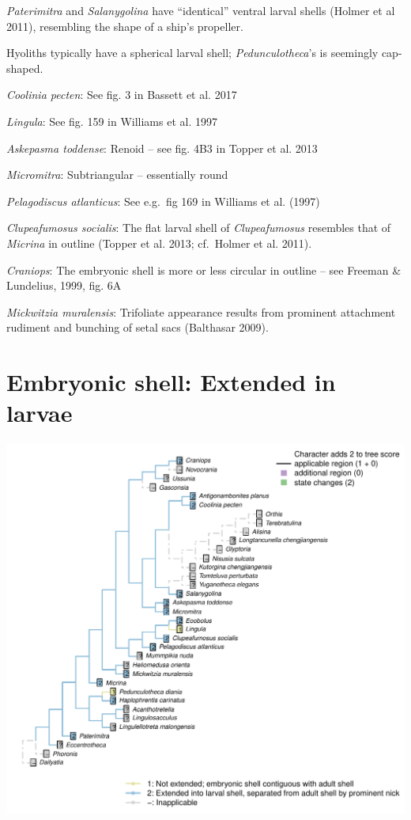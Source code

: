 \documentclass[]{book}
\theoremstyle{definition}
\theoremstyle{definition}
\theoremstyle{definition}
\theoremstyle{remark}
\begin{document}
\emph{Paterimitra} and \emph{Salanygolina} have ``identical'' ventral
larval shells (Holmer et al 2011), resembling the shape of a ship's
propeller.

Hyoliths typically have a spherical larval shell;
\emph{Pedunculotheca}'s is seemingly cap-shaped.

\emph{Coolinia pecten}: See fig. 3 in Bassett et al. 2017

\emph{Lingula}: See fig. 159 in Williams et al. 1997

\emph{Askepasma toddense}: Renoid -- see fig. 4B3 in Topper et al. 2013

\emph{Micromitra}: Subtriangular -- essentially round

\emph{Pelagodiscus atlanticus}: See e.g.~fig 169 in Williams et al.
(1997)

\emph{Clupeafumosus socialis}: The flat larval shell of
\emph{Clupeafumosus} resembles that of \emph{Micrina} in outline (Topper
et al. 2013; cf.~Holmer et al. 2011).

\emph{Craniops}: The embryonic shell is more or less circular in outline
-- see Freeman \& Lundelius, 1999, fig. 6A

\emph{Mickwitzia muralensis}: Trifoliate appearance results from
prominent attachment rudiment and bunching of setal sacs (Balthasar
2009).

\hypertarget{embryonic-shell-extended-in-larvae}{%
\section*{Embryonic shell: Extended in
larvae}\label{embryonic-shell-extended-in-larvae}}

\includegraphics{Brachiopod_phylogeny_files/figure-latex/unnamed-chunk-5-64.pdf}
\end{document}
